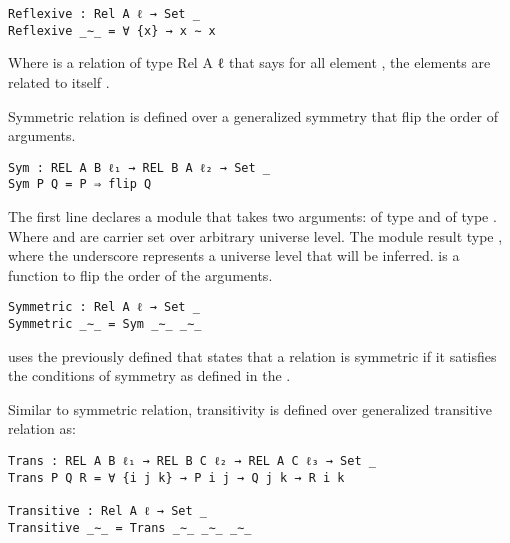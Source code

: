\begin{verbatim}
Reflexive : Rel A ℓ → Set _
Reflexive _∼_ = ∀ {x} → x ∼ x
\end{verbatim}

Where  is a relation of type {Rel A ℓ} that says for all element
, the elements are related to itself .

Symmetric relation is defined over a generalized symmetry that flip the order of arguments.

\begin{verbatim}
Sym : REL A B ℓ₁ → REL B A ℓ₂ → Set _
Sym P Q = P ⇒ flip Q
\end{verbatim}
The first line declares a module  that takes two arguments:
 of type  and  of type . Where  and  are carrier set over arbitrary universe
level. The module result type , where the underscore represents a
universe level that will be inferred.  is a function to flip the
order of the arguments.

\begin{verbatim}
Symmetric : Rel A ℓ → Set _
Symmetric _∼_ = Sym _∼_ _∼_
\end{verbatim}

 uses the previously defined  that states that a
relation  is symmetric if it satisfies the conditions of symmetry as
defined in the .

Similar to symmetric relation, transitivity is defined over generalized transitive relation as:

\begin{verbatim}
Trans : REL A B ℓ₁ → REL B C ℓ₂ → REL A C ℓ₃ → Set _
Trans P Q R = ∀ {i j k} → P i j → Q j k → R i k

Transitive : Rel A ℓ → Set _
Transitive _∼_ = Trans _∼_ _∼_ _∼_
\end{verbatim}

